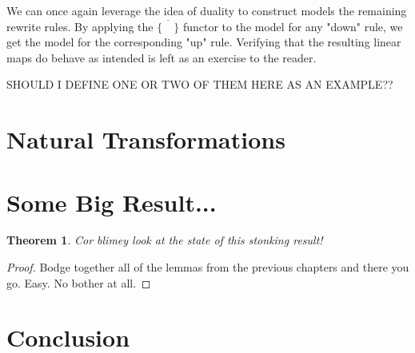 \documentclass[12pt, oneside]{article}
\theoremstyle{plain}
\newtheorem{theorem}{Theorem}[section]
\theoremstyle{definition}
\begin{document}
We can once again leverage the idea of duality to construct models the remaining rewrite rules.
By applying the $\overline{\{\quad\}}$ functor to the model for any "down" rule, we get the model for the corresponding "up" rule.
Verifying that the resulting linear maps do behave as intended is left as an exercise to the reader.

SHOULD I DEFINE ONE OR TWO OF THEM HERE AS AN EXAMPLE??

\newpage
\section{Natural Transformations}

\newpage
\section{Some Big Result...}

\begin{theorem}
    Cor blimey look at the state of this stonking result!
\end{theorem}

\begin{proof}
    Bodge together all of the lemmas from the previous chapters and there you go.
    Easy.
    No bother at all.
\end{proof}

\newpage
\section{Conclusion}

\newpage


\end{document}
